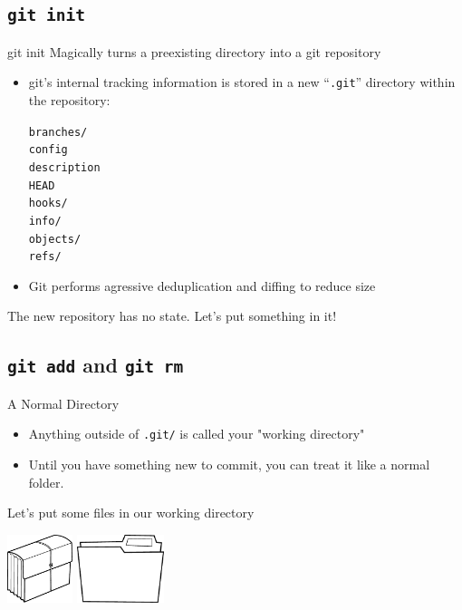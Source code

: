 \documentclass[aspectratio=43]{beamer}
\begin{document}
\subsection{\texttt{git init}}

\begin{frame}{git init}
    Magically turns a preexisting directory into a git repository
    \begin{itemize}
    \item git's internal tracking information is stored in a new
        ``\texttt{.git}'' directory within the repository:
        \begin{footnotesize}
        \begin{multicols}{4}
            \texttt{branches/} \\
            \texttt{config} \\
            \texttt{description} \\
            \texttt{HEAD} \\
            \texttt{hooks/} \\
            \texttt{info/} \\
            \texttt{objects/} \\
            \texttt{refs/}
        \end{multicols}
        \end{footnotesize}
    \item Git performs agressive deduplication and diffing to reduce size
    \end{itemize}
    The new repository has no state. Let's put something in it!
\end{frame}

\subsection{\texttt{git add} and \texttt{git rm}}

\begin{frame}{A Normal Directory}
    \begin{itemize}
    \item Anything outside of \texttt{.git/} is called your "working directory"
    \item Until you have something new to commit, you can treat it like a normal
        folder.
    \end{itemize}
    Let's put some files in our working directory
    \begin{center}
        \includegraphics[height=2cm]{resources/dossier.pdf}\hspace{.5cm}%
        \includegraphics[height=2cm]{resources/dossier_folder.pdf}
    \end{center}
\end{frame}
\end{document}
